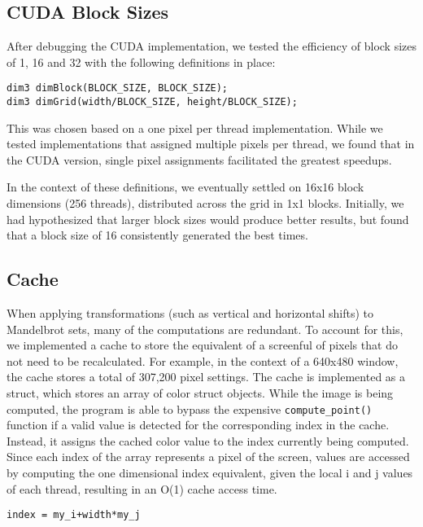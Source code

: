 \documentclass{article}
\begin{document}
\subsection{CUDA Block Sizes}

After debugging the CUDA implementation, we tested the efficiency of block sizes of 1, 16 and 32 with the following definitions in place: 

\begin{verbatim}
dim3 dimBlock(BLOCK_SIZE, BLOCK_SIZE); 
dim3 dimGrid(width/BLOCK_SIZE, height/BLOCK_SIZE);
\end{verbatim}

This was chosen based on a one pixel per thread implementation.
While we tested implementations that assigned multiple pixels per thread, we found that in the CUDA version, single pixel assignments facilitated the greatest speedups.

In the context of these definitions, we eventually settled on 16x16 block dimensions (256 threads), distributed across the grid in 1x1 blocks.
Initially, we had hypothesized that larger block sizes would produce better results, but found that a block size of 16 consistently generated the best times.

\subsection{Cache}

When applying transformations (such as vertical and horizontal shifts) to Mandelbrot sets, many of the computations are redundant.
To account for this, we implemented a cache to store the equivalent of a screenful of pixels that do not need to be recalculated.
For example, in the context of a 640x480 window, the cache stores a total of 307,200 pixel settings.
The cache is implemented as a struct, which stores an array of color struct objects.
While the image is being computed, the program is able to bypass the expensive \verb|compute_point()| function if a valid value is detected for the corresponding index in the cache.
Instead, it assigns the cached color value to the index currently being computed.
Since each index of the array represents a pixel of the screen, values are accessed by computing the one dimensional index equivalent, given the local i and j values of each thread, resulting in an O(1) cache access time.

\begin{verbatim}
index = my_i+width*my_j
\end{verbatim}
\end{document}
